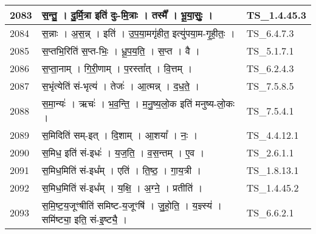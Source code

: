 \documentclass[17pt]{extarticle}
\begin{document}
\begin{longtable}{||p{0.4in}||p{4.9in}||p{0.9in}||}
    2083 & स॒न्तु॒   ।   दु॒र्मि॒त्रा इति॑ दुः{-}मि॒त्राः   ।   तस्मै᳚   ।   भू॒या॒सुः॒   ।    & TS\_1.4.45.3       \\
    
    \hline
        
    2084 & स॒न्नाः   ।   अ॒स॒न्न्   ।   इति॑   ।   उ॒प॒या॒मगृ॑हीत॒ इत्यु॑पया॒म{-}गृ॒ही॒तः॒   ।    & TS\_6.4.7.3       \\
    
    \hline
        
    2085 & स॒प्तभि॒रिति॑ स॒प्त{-}भिः॒   ।   धू॒प॒य॒ति॒   ।   स॒प्त   ।   वै   ।    & TS\_5.1.7.1       \\
    
    \hline
        
    2086 & स॒प्ता॒नाम्   ।   गि॒री॒णाम्   ।   प॒रस्ता᳚त्   ।   वि॒त्तम्   ।    & TS\_6.2.4.3       \\
    
    \hline
        
    2087 & स॒भृंत्येति॑ सं{-}भृत्य॑   ।   तेजः॑   ।   आ॒त्मन्न्   ।   द॒ध॒ते॒   ।    & TS\_7.5.8.5       \\
    
    \hline
        
    2088 & स॒मा॒न्यः॑   ।   ऋचः॑   ।   भ॒व॒न्ति॒   ।   म॒नु॒ष्य॒लो॒क इति॑ मनुष्य{-}लो॒कः   ।    & TS\_7.5.4.1       \\
    
    \hline
        
    2089 & स॒मिदिति॑ सम्{-}इत्   ।   दि॒शाम्   ।   आ॒शया᳚   ।   नः॒   ।    & TS\_4.4.12.1       \\
    
    \hline
        
    2090 & स॒मिध॒ इति॑ सं{-}इधः॑   ।   य॒ज॒ति॒   ।   व॒स॒न्तम्   ।   ए॒व   ।    & TS\_2.6.1.1       \\
    
    \hline
        
    2091 & स॒मिध॒मिति॑ सं{-}इध᳚म्   ।   एति॑   ।   ति॒ष्ठ॒   ।   गा॒य॒त्री   ।    & TS\_1.8.13.1       \\
    
    \hline
        
    2092 & स॒मिध॒मिति॑ सं{-}इध᳚म्   ।   य॒क्षि॒   ।   अ॒ग्ने॒   ।   प्रतीति॑   ।    & TS\_1.4.45.2       \\
    
    \hline
        
    2093 & स॒मि॒ष्ट॒य॒जूꣳषीति॑ समिष्ट{-}य॒जूꣳषि॑   ।   जु॒हो॒ति॒   ।   य॒ज्ञ्स्य॑   ।   समि॑ष्ट्या॒ इति॒ सं{-}इ॒ष्ट्यै॒   ।    & TS\_6.6.2.1       \\
    

\end{longtable}
\end{document}
